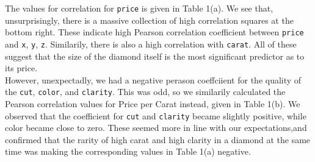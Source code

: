 \documentclass[11pt,letterpaper]{article}
\begin{document}
The values for correlation for \texttt{price} is given in 
Table 1(a). We see that, unsurprisingly, there is a massive collection of high 
correlation squares at the bottom right. These indicate high Pearson 
correlation coefficient between \texttt{price} and \texttt{x}, \texttt{y}, 
\texttt{z}. Similarily, there is also a high correlation with \texttt{carat}.
All of these suggest that the size of the diamond itself is the most significant 
predictor as to its price. \\ 

However, unexpectadly, we had a negative perason coeffciient for the quality of 
the \texttt{cut}, \texttt{color}, and \texttt{clarity}. This was odd, so we
similarily calculated the Pearson correlation values for Price per Carat instead, 
given in Table 1(b). We observed that the coefficient for \texttt{cut} and 
\texttt{clarity} became slightly positive, while color became close to zero. 
These seemed more in line with our expectations,and confirmed that the rarity of 
high carat and high clarity in a diamond at the same time was making the 
corresponding values in Table 1(a) negative. 
\end{document}
